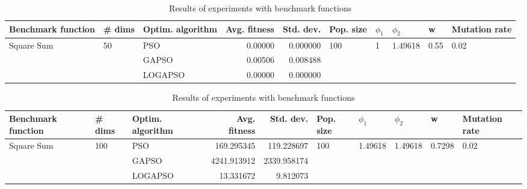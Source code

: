 \documentclass{article}
\begin{document}
\begin{table}
\centering
\caption{Results of experiments with benchmark functions}
\begin{tabular}{lllrrlllll}
\toprule
         Benchmark function &             \# dims & Optim. algorithm &  Avg. fitness &  Std. dev. &            Pop. size &         $\phi_{1}$ &               $\phi_{2}$ &                     w &         Mutation rate \\
\midrule
\multirow{3}{*}{Square Sum} & \multirow{3}{*}{50} &              PSO &       0.00000 &   0.000000 & \multirow{3}{*}{100} & \multirow{3}{*}{1} & \multirow{3}{*}{1.49618} & \multirow{3}{*}{0.55} & \multirow{3}{*}{0.02} \\
                            &                     &            GAPSO &       0.00506 &   0.008488 &                      &                    &                          &                       &                       \\
                            &                     &          LOGAPSO &       0.00000 &   0.000000 &                      &                    &                          &                       &                       \\
\bottomrule
\end{tabular}
\end{table}
\begin{table}
\centering
\caption{Results of experiments with benchmark functions}
\begin{tabular}{lllrrlllll}
\toprule
         Benchmark function &              \# dims & Optim. algorithm &  Avg. fitness &   Std. dev. &            Pop. size &               $\phi_{1}$ &               $\phi_{2}$ &                       w &         Mutation rate \\
\midrule
\multirow{3}{*}{Square Sum} & \multirow{3}{*}{100} &              PSO &    169.295345 &  119.228697 & \multirow{3}{*}{100} & \multirow{3}{*}{1.49618} & \multirow{3}{*}{1.49618} & \multirow{3}{*}{0.7298} & \multirow{3}{*}{0.02} \\
                            &                      &            GAPSO &   4241.913912 & 2339.958174 &                      &                          &                          &                         &                       \\
                            &                      &          LOGAPSO &     13.331672 &    9.812073 &                      &                          &                          &                         &                       \\
\bottomrule
\end{tabular}
\end{table}
\end{document}
